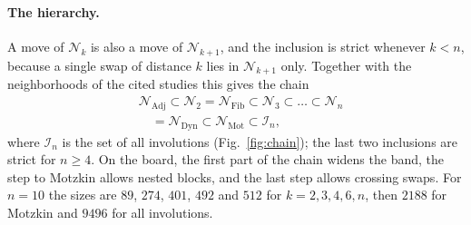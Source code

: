 \documentclass[letterpaper]{article} %
\theoremstyle{definition}
\newcommand{\N}{\mathcal{N}}
\begin{document}
\paragraph{The hierarchy.} A move of $\N_k$ is also a move of
$\N_{k+1}$, and the inclusion is strict whenever $k<n$, because a single
swap of distance $k$ lies in $\N_{k+1}$ only. Together with the
neighborhoods of the cited studies this gives the chain
\begin{equation}\label{eq:chain}
\begin{split}
&\N_{\mathrm{Adj}}\subset\N_2=\N_{\mathrm{Fib}}\subset\N_3\subset\dots\subset\N_n\\
&\quad=\N_{\mathrm{Dyn}}\subset\N_{\mathrm{Mot}}\subset\mathcal I_n,
\end{split}
\end{equation}
where $\mathcal I_n$ is the set of all involutions
(Fig.~\ref{fig:chain}); the last two inclusions are strict for $n\geq 4$. On the board, the first part of the chain widens
the band, the step to Motzkin allows nested blocks, and the last step
allows crossing swaps. For $n=10$ the sizes are $89$, $274$, $401$, $492$
and $512$ for $k=2,3,4,6,n$, then $2188$ for Motzkin and $9496$ for all
involutions.
\end{document}
